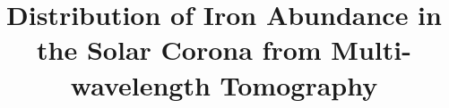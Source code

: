 \documentclass[craaa]{baaa}
\begin{document}


\title{Distribution of Iron Abundance in the Solar Corona from Multi-wavelength Tomography}

\end{document}
